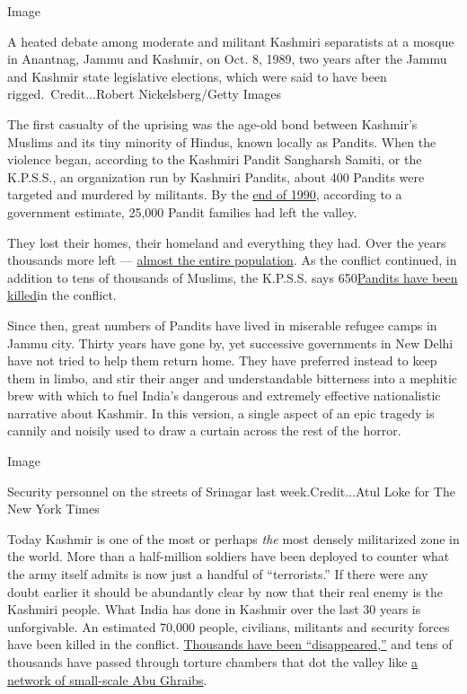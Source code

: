 Image

A heated debate among moderate and militant Kashmiri separatists at a
mosque in Anantnag, Jammu and Kashmir, on Oct. 8, 1989, two years after
the Jammu and Kashmir state legislative elections, which were said to
have been rigged.~Credit...Robert Nickelsberg/Getty Images

The first casualty of the uprising was the age-old bond between
Kashmir's Muslims and its tiny minority of Hindus, known locally as
Pandits. When the violence began, according to the Kashmiri Pandit
Sangharsh Samiti, or the K.P.S.S., an organization run by Kashmiri
Pandits, about 400 Pandits were targeted and murdered by militants. By
the
\href{https://indianexpress.com/article/explained/why-kashmiris-want-a-fair-probe-into-the-killings-of-pandits-prosecution-of-guilty-4786855/}{end
of 1990}, according to a government estimate, 25,000 Pandit families had
left the valley.

They lost their homes, their homeland and everything they had. Over the
years thousands more left ---
\href{https://www.aljazeera.com/indepth/spotlight/kashmirtheforgottenconflict/2011/07/2011724204546645823.html}{almost
the entire population}. As the conflict continued, in addition to tens
of thousands of Muslims, the K.P.S.S. says
650\href{https://www.aljazeera.com/indepth/spotlight/kashmirtheforgottenconflict/2011/07/201176134818984961.html}{Pandits
have been killed}in the conflict.

Since then, great numbers of Pandits have lived in miserable refugee
camps in Jammu city. Thirty years have gone by, yet successive
governments in New Delhi have not tried to help them return home. They
have preferred instead to keep them in limbo, and stir their anger and
understandable bitterness into a mephitic brew with which to fuel
India's dangerous and extremely effective nationalistic narrative about
Kashmir. In this version, a single aspect of an epic tragedy is cannily
and noisily used to draw a curtain across the rest of the horror.

Image

Security personnel on the streets of Srinagar last week.Credit...Atul
Loke for The New York Times

Today Kashmir is one of the most or perhaps \emph{the} most densely
militarized zone in the world. More than a half-million soldiers have
been deployed to counter what the army itself admits is now just a
handful of ``terrorists.'' If there were any doubt earlier it should be
abundantly clear by now that their real enemy is the Kashmiri people.
What India has done in Kashmir over the last 30 years is unforgivable.
An estimated 70,000 people, civilians, militants and security forces
have been killed in the conflict.
\href{https://www.csmonitor.com/World/Asia-South-Central/2008/0201/p07s03-wosc.html}{Thousands
have been ``disappeared,''} and tens of thousands have passed through
torture chambers that dot the valley like
\href{http://jkccs.net/wp-content/uploads/2019/05/TORTURE-Indian-State\%E2\%80\%99s-Instrument-of-Control-in-Indian-administered-Jammu-and-Kashmir.pdf}{a
network of small-scale Abu Ghraibs}.

